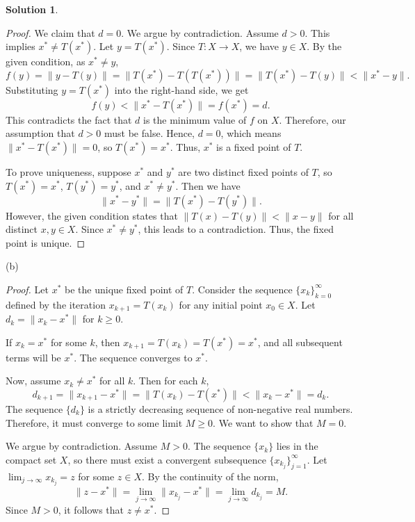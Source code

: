\documentclass[12pt]{article}
\theoremstyle{definition}
\newtheorem*{solution}{\normalfont\textbf{Solution}}
\begin{document}
\begin{enumerate}[leftmargin=*]
\begin{solution}
\begin{proof}
                We claim that \( d = 0 \). We argue by contradiction. Assume \( d > 0 \). This implies \( x^* \neq T(x^*) \). Let \( y = T(x^*) \). Since \( T: X \to X \), we have \( y \in X \). By the given condition, as \( x^* \neq y \),
                \[
                f(y) = \|y - T(y)\| = \|T(x^*) - T(T(x^*))\| = \|T(x^*) - T(y)\| < \|x^* - y\|.
                \]
                Substituting \( y = T(x^*) \) into the right-hand side, we get
                \[
                f(y) < \|x^* - T(x^*)\| = f(x^*) = d.
                \]
                This contradicts the fact that \( d \) is the minimum value of \( f \) on \( X \). Therefore, our assumption that \( d > 0 \) must be false. Hence, \( d = 0 \), which means \( \|x^* - T(x^*)\| = 0 \), so \( T(x^*) = x^* \). Thus, \( x^* \) is a fixed point of \( T \).

                To prove uniqueness, suppose \( x^* \) and \( y^* \) are two distinct fixed points of \( T \), so \( T(x^*) = x^* \), \( T(y^*) = y^* \), and \( x^* \neq y^* \). Then we have
                \[
                \|x^* - y^*\| = \|T(x^*) - T(y^*)\|.
                \]
                However, the given condition states that \( \|T(x) - T(y)\| < \|x - y\| \) for all distinct \( x, y \in X \). Since \( x^* \neq y^* \), this leads to a contradiction. Thus, the fixed point is unique.
            \end{proof}
        \item[(b)]
            \begin{proof}
                Let \( x^* \) be the unique fixed point of \( T \). Consider the sequence \( \{x_k\}_{k=0}^\infty \) defined by the iteration \( x_{k+1} = T(x_k) \) for any initial point \( x_0 \in X \). Let \( d_k = \|x_k - x^*\| \) for \( k \ge 0 \).

                If \( x_k = x^* \) for some \( k \), then \( x_{k+1} = T(x_k) = T(x^*) = x^* \), and all subsequent terms will be \( x^* \). The sequence converges to \( x^* \).

                Now, assume \( x_k \neq x^* \) for all \( k \). Then for each \( k \),
                \[
                d_{k+1} = \|x_{k+1} - x^*\| = \|T(x_k) - T(x^*)\| < \|x_k - x^*\| = d_k.
                \]
                The sequence \( \{d_k\} \) is a strictly decreasing sequence of non-negative real numbers. Therefore, it must converge to some limit \( M \ge 0 \). We want to show that \( M = 0 \).

                We argue by contradiction. Assume \( M > 0 \). The sequence \( \{x_k\} \) lies in the compact set \( X \), so there must exist a convergent subsequence \( \{x_{k_j}\}_{j=1}^\infty \). Let \( \lim_{j \to \infty} x_{k_j} = z \) for some \( z \in X \).
                By the continuity of the norm,
                \[
                \|z - x^*\| = \lim_{j \to \infty} \|x_{k_j} - x^*\| = \lim_{j \to \infty} d_{k_j} = M.
                \]
                Since \( M > 0 \), it follows that \( z \neq x^* \).


\end{proof}
\end{solution}
\end{enumerate}
\end{document}
